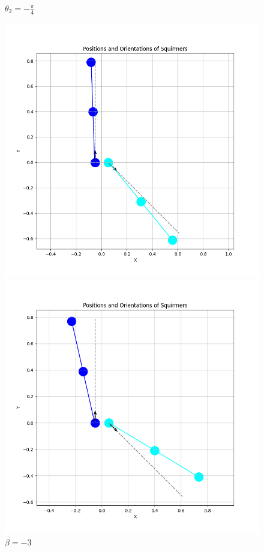 \documentclass{article}
\begin{document}
\begin{figure}[H]
    \centering
    \textbf{$\theta_2 = -\frac{\pi}{4}$}\par\medskip
    \begin{minipage}{0.49\textwidth}
        \includegraphics[width=1.1\textwidth]{graphs/simulations/sim_sq_sq/betam3/mpi_4_.png}
        \caption{\footnotesize $\beta = -3$}
    \end{minipage}\hfill
    \begin{minipage}{0.49\textwidth}
        \includegraphics[width=1.1\textwidth]{graphs/simulations/sim_sq_sq/beta3/mpi_4_.png}

\end{minipage}
\end{figure}
\end{document}
